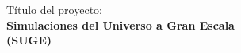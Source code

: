 \section*{}
\begin{center}
{\LARGE T\'itulo del proyecto: \\ {\bf Simulaciones del Universo a Gran Escala}\\{\bf (SUGE)}} 
\end{center}
